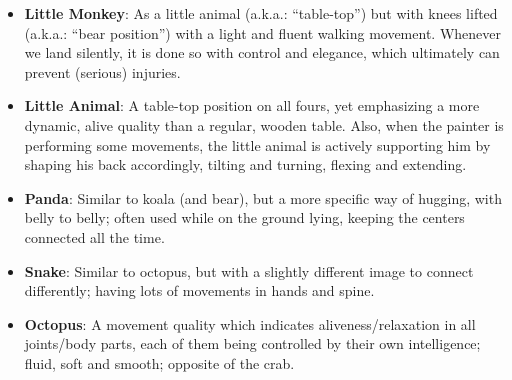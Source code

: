\begin{itemize}
    \item \textbf{Little Monkey}: As a little animal (a.k.a.: ``table-top'') but with knees lifted (a.k.a.: ``bear position'') with a light and fluent walking movement.
    Whenever we land silently, it is done so with control and elegance, which ultimately can prevent (serious) injuries.
    \item \textbf{Little Animal}: A table-top position on all fours, yet emphasizing a more dynamic, alive quality than a regular, wooden table.
    Also, when the painter is performing some movements, the little animal is actively supporting him by shaping his back accordingly, tilting and turning, flexing and extending.
    \item \textbf{Panda}: Similar to koala (and bear), but a more specific way of hugging, with belly to belly; often used while on the ground lying, keeping the centers connected all the time.
    \item \textbf{Snake}: Similar to octopus, but with a slightly different image to connect differently; having lots of movements in hands and spine.
    \item \textbf{Octopus}: A movement quality which indicates aliveness/relaxation in all joints/body parts, each of them being controlled by their own intelligence; fluid, soft and smooth; opposite of the crab.
\end{itemize}
